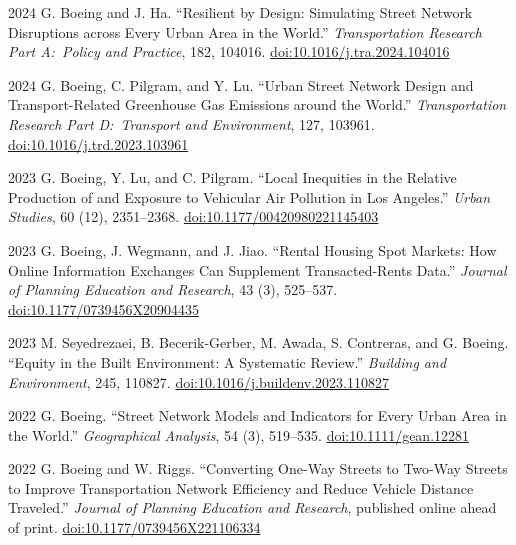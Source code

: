 \documentclass[11pt,letterpaper]{report}
\begin{document}
\begin{tablist}
        \item[2024] \tab{}G. Boeing and J. Ha. \enquote{Resilient by Design: Simulating Street Network Disruptions across Every Urban Area in the World.} \textit{Transportation Research Part A:\ Policy and Practice}, 182, 104016. \href{https://doi.org/10.1016/j.tra.2024.104016}{doi:10.1016/j.tra.2024.104016}

        \item[2024] \tab{}G. Boeing, C. Pilgram, and Y. Lu. \enquote{Urban Street Network Design and Transport-Related Greenhouse Gas Emissions around the World.} \textit{Transportation Research Part D:\ Transport and Environment}, 127, 103961. \href{https://doi.org/10.1016/j.trd.2023.103961}{doi:10.1016/j.trd.2023.103961}

        \item[2023] \tab{}G. Boeing, Y. Lu, and C. Pilgram. \enquote{Local Inequities in the Relative Production of and Exposure to Vehicular Air Pollution in Los Angeles.} \textit{Urban Studies}, 60 (12), 2351--2368. \href{https://doi.org/10.1177/00420980221145403}{doi:10.1177/00420980221145403}

        \item[2023] \tab{}G. Boeing, J. Wegmann, and J. Jiao. \enquote{Rental Housing Spot Markets: How Online Information Exchanges Can Supplement Transacted-Rents Data.} \textit{Journal of Planning Education and Research}, 43 (3), 525--537. \href{https://doi.org/10.1177/0739456X20904435}{doi:10.1177/0739456X20904435}

        \item[2023] \tab{}M. Seyedrezaei, B. Becerik-Gerber, M. Awada, S. Contreras, and G. Boeing. \enquote{Equity in the Built Environment: A Systematic Review.} \textit{Building and Environment}, 245, 110827. \href{https://doi.org/10.1016/j.buildenv.2023.110827}{doi:10.1016/j.buildenv.2023.110827}

        \item[2022] \tab{}G. Boeing. \enquote{Street Network Models and Indicators for Every Urban Area in the World.} \textit{Geographical Analysis}, 54 (3), 519--535. \href{https://doi.org/10.1111/gean.12281}{doi:10.1111/gean.12281}

        \item[2022] \tab{}G. Boeing and W. Riggs. \enquote{Converting One-Way Streets to Two-Way Streets to Improve Transportation Network Efficiency and Reduce Vehicle Distance Traveled.} \textit{Journal of Planning Education and Research}, published online ahead of print. \href{https://doi.org/10.1177/0739456X221106334}{doi:10.1177/0739456X221106334}


\end{tablist}
\end{document}
